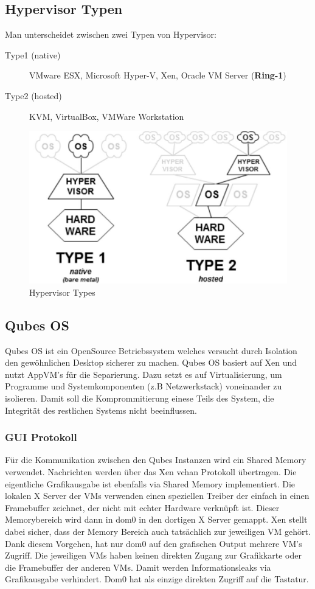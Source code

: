 \subsection{Hypervisor Typen}
Man unterscheidet zwischen zwei Typen von Hypervisor:

\begin{description}
	\item[Type1 (native)] VMware ESX, Microsoft Hyper-V, Xen, Oracle VM Server (\textbf{Ring-1})
	\item[Type2 (hosted)] KVM, VirtualBox, VMWare Workstation
\end{description}

\begin{figure}[h]
\centering
\includegraphics[width=0.5\linewidth]{images/hypervisor_types}
\caption{Hypervisor Types}
\label{fig:hypervisortypes}
\end{figure}

\subsection{Qubes OS}
Qubes OS ist ein OpenSource Betriebssystem welches versucht durch Isolation den gewöhnlichen Desktop sicherer zu machen. Qubes OS basiert auf Xen und nutzt AppVM's für die Separierung. Dazu setzt es auf Virtualisierung, um Programme und Systemkomponenten (z.B Netzwerkstack) voneinander zu isolieren. Damit soll die Komprommitierung einese Teils des System, die Integrität des restlichen Systems nicht beeinflussen. 

\subsubsection{GUI Protokoll}
Für die Kommunikation zwischen den Qubes Instanzen wird ein Shared Memory verwendet. Nachrichten werden über das Xen vchan Protokoll übertragen. Die eigentliche Grafikausgabe ist ebenfalls via Shared Memory implementiert. Die lokalen X Server der VMs verwenden einen speziellen Treiber der einfach in einen Framebuffer zeichnet, der nicht mit echter Hardware verknüpft ist. Dieser Memorybereich wird dann in dom0 in den dortigen X Server gemappt. Xen stellt dabei sicher, dass der Memory Bereich auch tatsächlich zur jeweiligen VM gehört. Dank diesem Vorgehen, hat nur dom0 auf den grafischen Output mehrere VM's Zugriff. Die jeweiligen VMs haben keinen direkten Zugang zur Grafikkarte oder die Framebuffer der anderen VMs. Damit werden Informationsleaks via Grafikausgabe verhindert. Dom0 hat als einzige direkten Zugriff auf die Tastatur. 

